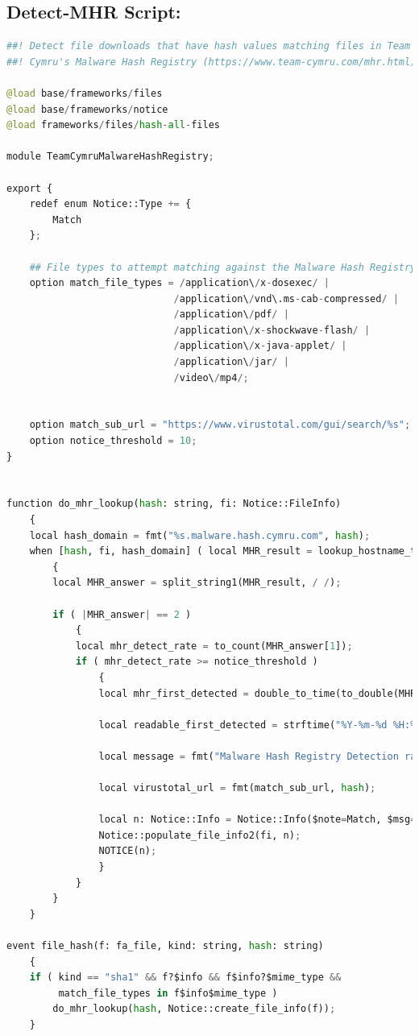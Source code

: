 \subsection{Detect-MHR Script:}
\begin{lstlisting}[language=Python, caption=detect-MHR.zeek]
##! Detect file downloads that have hash values matching files in Team
##! Cymru's Malware Hash Registry (https://www.team-cymru.com/mhr.html).

@load base/frameworks/files
@load base/frameworks/notice
@load frameworks/files/hash-all-files

module TeamCymruMalwareHashRegistry;

export {
	redef enum Notice::Type += {
		Match
	};

	## File types to attempt matching against the Malware Hash Registry.
	option match_file_types = /application\/x-dosexec/ |
	                         /application\/vnd\.ms-cab-compressed/ |
	                         /application\/pdf/ |
	                         /application\/x-shockwave-flash/ |
	                         /application\/x-java-applet/ |
	                         /application\/jar/ |
	                         /video\/mp4/;


	option match_sub_url = "https://www.virustotal.com/gui/search/%s";
	option notice_threshold = 10;
}


function do_mhr_lookup(hash: string, fi: Notice::FileInfo)
	{
	local hash_domain = fmt("%s.malware.hash.cymru.com", hash);
	when [hash, fi, hash_domain] ( local MHR_result = lookup_hostname_txt(hash_domain) )
		{
		local MHR_answer = split_string1(MHR_result, / /);

		if ( |MHR_answer| == 2 )
			{
			local mhr_detect_rate = to_count(MHR_answer[1]);
			if ( mhr_detect_rate >= notice_threshold )
				{
				local mhr_first_detected = double_to_time(to_double(MHR_answer[0]));

				local readable_first_detected = strftime("%Y-%m-%d %H:%M:%S", mhr_first_detected);

				local message = fmt("Malware Hash Registry Detection rate: %d%%  Last seen: %s", mhr_detect_rate, readable_first_detected);

				local virustotal_url = fmt(match_sub_url, hash);

				local n: Notice::Info = Notice::Info($note=Match, $msg=message, $sub=virustotal_url);
				Notice::populate_file_info2(fi, n);
				NOTICE(n);
				}
			}
		}
	}

event file_hash(f: fa_file, kind: string, hash: string)
	{
	if ( kind == "sha1" && f?$info && f$info?$mime_type &&
	     match_file_types in f$info$mime_type )
		do_mhr_lookup(hash, Notice::create_file_info(f));
	}

 \end{lstlisting}

